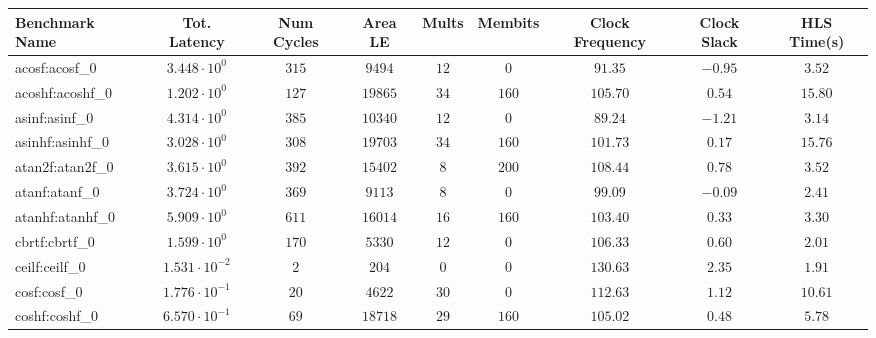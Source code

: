 \begin{tabular}{|l|c|c|c|c|c|c|c|c|}
\hline
Benchmark Name               & Tot. Latency            & Num Cycles & Area LE    & Mults   & Membits  & Clock Frequency & Clock Slack & HLS Time(s) \\
\hline
acosf:acosf\_0               & $ 3.448 \cdot 10^{0}  $ & $ 315    $ & $ 9494   $ & $ 12  $ & $ 0    $ & $ 91.35       $ & $ -0.95   $ & $ 3.52    $ \\
acoshf:acoshf\_0             & $ 1.202 \cdot 10^{0}  $ & $ 127    $ & $ 19865  $ & $ 34  $ & $ 160  $ & $ 105.70      $ & $ 0.54    $ & $ 15.80   $ \\
asinf:asinf\_0               & $ 4.314 \cdot 10^{0}  $ & $ 385    $ & $ 10340  $ & $ 12  $ & $ 0    $ & $ 89.24       $ & $ -1.21   $ & $ 3.14    $ \\
asinhf:asinhf\_0             & $ 3.028 \cdot 10^{0}  $ & $ 308    $ & $ 19703  $ & $ 34  $ & $ 160  $ & $ 101.73      $ & $ 0.17    $ & $ 15.76   $ \\
atan2f:atan2f\_0             & $ 3.615 \cdot 10^{0}  $ & $ 392    $ & $ 15402  $ & $ 8   $ & $ 200  $ & $ 108.44      $ & $ 0.78    $ & $ 3.52    $ \\
atanf:atanf\_0               & $ 3.724 \cdot 10^{0}  $ & $ 369    $ & $ 9113   $ & $ 8   $ & $ 0    $ & $ 99.09       $ & $ -0.09   $ & $ 2.41    $ \\
atanhf:atanhf\_0             & $ 5.909 \cdot 10^{0}  $ & $ 611    $ & $ 16014  $ & $ 16  $ & $ 160  $ & $ 103.40      $ & $ 0.33    $ & $ 3.30    $ \\
cbrtf:cbrtf\_0               & $ 1.599 \cdot 10^{0}  $ & $ 170    $ & $ 5330   $ & $ 12  $ & $ 0    $ & $ 106.33      $ & $ 0.60    $ & $ 2.01    $ \\
ceilf:ceilf\_0               & $ 1.531 \cdot 10^{-2} $ & $ 2      $ & $ 204    $ & $ 0   $ & $ 0    $ & $ 130.63      $ & $ 2.35    $ & $ 1.91    $ \\
cosf:cosf\_0                 & $ 1.776 \cdot 10^{-1} $ & $ 20     $ & $ 4622   $ & $ 30  $ & $ 0    $ & $ 112.63      $ & $ 1.12    $ & $ 10.61   $ \\
coshf:coshf\_0               & $ 6.570 \cdot 10^{-1} $ & $ 69     $ & $ 18718  $ & $ 29  $ & $ 160  $ & $ 105.02      $ & $ 0.48    $ & $ 5.78    $ \\

\end{tabular}
